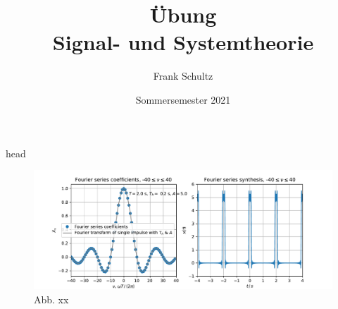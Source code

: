 \documentclass[mathserif, aspectratio=43]{intbeamer}
\title[Übung SigSys]{Übung \\ \huge Signal- und Systemtheorie}
\author[Schultz]{Frank Schultz}
\date[SoSe 2021]{Sommersemester 2021}
\begin{document}
\maketitle

\begin{frame}{head}
\begin{figure}
  \includegraphics[width=\textwidth]{fs/D1483A84E2_0.pdf}
  \caption{Abb. xx}
\end{figure}
\end{frame}
\end{document}
